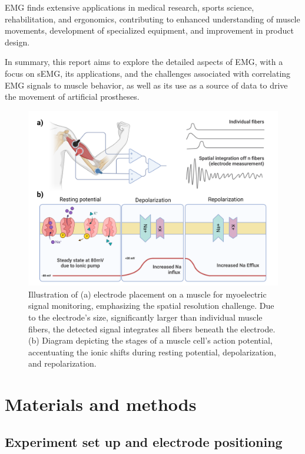 \documentclass[conference]{IEEEtran}
\begin{document}
EMG finds extensive applications in medical research, sports science, rehabilitation, and ergonomics, 
contributing to enhanced understanding of muscle movements, development of specialized equipment, and 
improvement in product design. 

In summary, this report aims to explore the detailed aspects of EMG, with a focus on sEMG, its applications, 
and the challenges associated with correlating EMG signals to muscle behavior, as well as its use as a source 
of data to drive the movement of artificial prostheses.

\begin{figure}[h]
   \centering
   \includegraphics[width=1\linewidth]{actionpotential.png}
   \caption{Illustration of (a) electrode placement on a muscle for myoelectric signal monitoring, emphasizing the spatial resolution 
   challenge. Due to the electrode's size, significantly larger than individual muscle fibers, the detected signal integrates all fibers beneath the electrode. 
   (b) Diagram depicting the stages of a muscle cell's action potential, accentuating the ionic shifts during resting potential, depolarization, and repolarization.}
   \label{fig:actionpotential}
\end{figure}


\section{Materials and methods}
\subsection{Experiment set up and electrode positioning}
\end{document}
